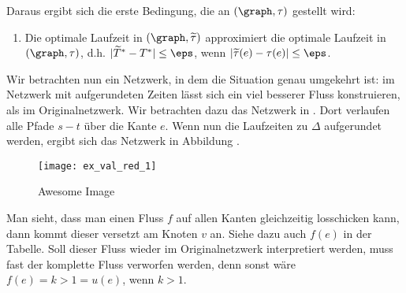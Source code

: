 Daraus ergibt sich die erste Bedingung, die an $(\graph, \tau)$ gestellt wird:
\begin{enumerate}[label={\textbf{(A\arabic*)}}]
    \item Die optimale Laufzeit in $(\graph, \widetilde{\tau})$ approximiert die optimale
        Laufzeit in $(\graph, \tau)$, d.h. $|\widetilde{T}^* - T^*| \leq \eps$,
        wenn $|\widetilde{\tau}(e) - \tau(e)| \leq \eps$. \label{a1}
\end{enumerate}

\begin{example}

    Wir betrachten nun ein Netzwerk, in dem die Situation genau umgekehrt ist:
    im Netzwerk mit aufgerundeten Zeiten lässt sich ein viel besserer Fluss
    konstruieren, als im Originalnetzwerk. Wir betrachten dazu das Netzwerk
    in . Dort verlaufen alle Pfade $s-t$ über die
    Kante $e$. Wenn nun die Laufzeiten zu $\Delta$ aufgerundet werden,
    ergibt sich das Netzwerk in Abbildung .

    \begin{figure}[H]
    \centering
    \texttt{[image: ex\_val\_red\_1]}
    \caption{Awesome Image}
    \label{fig:ex_val_red_1}
    \end{figure}
    
    Man sieht, dass man einen Fluss $f$ auf allen Kanten gleichzeitig losschicken
    kann, dann kommt dieser versetzt am Knoten $v$ an. Siehe dazu auch
    $f(e)$ in der Tabelle. Soll dieser Fluss wieder im Originalnetzwerk
    interpretiert werden, muss fast der komplette Fluss verworfen werden, denn
    sonst wäre $f(e) = k > 1 = u(e)$, wenn $k > 1$.
    

\end{example}
